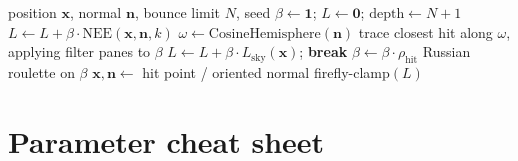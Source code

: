 \documentclass[11pt,a4paper]{article}
\newcommand{\vect}[1]{\bm{#1}}
\begin{document}
\begin{algorithm}[H]
\caption{PathLi --- one spp at a surface sample}
\begin{algorithmic}[1]
\Require position $\vect{x}$, normal $\vect{n}$, bounce limit $N$, seed
\State $\beta \leftarrow \mathbf{1}$;\; $L\leftarrow\mathbf{0}$;\;
       $\mathrm{depth}\leftarrow N+1$
  \State $L \leftarrow L + \beta\cdot\mathrm{NEE}(\vect{x},\vect{n},k)$
  \State $\omega\leftarrow\mathrm{CosineHemisphere}(\vect{n})$
  \State trace closest hit along $\omega$, applying filter panes to $\beta$
    \State $L\leftarrow L+\beta\cdot L_{\mathrm{sky}}(\vect{x})$;\;
           \textbf{break}
  \EndIf
  \State $\beta\leftarrow\beta\cdot\rho_{\mathrm{hit}}$
    \State Russian roulette on $\beta$
  \EndIf
  \State $\vect{x},\vect{n}\leftarrow$ hit point / oriented normal
\EndFor
\State \Return firefly-clamp$(L)$
\end{algorithmic}
\end{algorithm}

\section{Parameter cheat sheet}
\label{sec:params}
\end{document}
